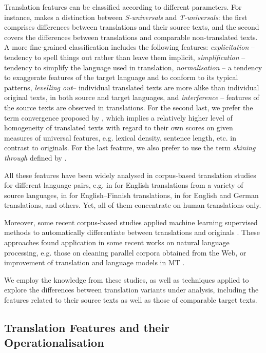 \documentclass[output=paper]{LSP/langsci}
\begin{document}
Translation features can be classified according to different parameters. For instance, \citet{Chesterman2004} makes a distinction between \textit{S-universals} and \textit{T-universals}: the ﬁrst comprises differences between translations and their source texts, and the second covers the differences between translations and comparable non-translated texts. A more ﬁne-grained classification includes the following features: \textit{explicitation} – tendency to spell things out rather than leave them implicit, \textit{simplification} – tendency to simplify the language used in translation, \textit{normalisation} – a tendency to exaggerate features of the target language and to conform to its typical patterns, \textit{levelling out}– individual translated texts are more alike than individual original texts, in both source and target languages, and \textit{interference} – features of the source texts are observed in translations. For the second last, we prefer the term convergence proposed by \citet{Laviosa2002}, which implies a relatively higher level of homogeneity of translated texts with regard to their own scores on given measures of universal features, e.g. lexical density, sentence length, etc. in contrast to originals.  For the last feature, we also prefer to use the term \textit{shining through} defined by \citet{Teich2003}.

All these features have been widely analysed in corpus-based translation studies for different language pairs, e.g. in \citet{Laviosa1996} for English translations from a variety of source languages, in \citet{Mauranen2000} for English--Finnish translations, in \citet{Teich2003} for English and German translations, and others. Yet, all of them concentrate on human translations only.

Moreover, some recent corpus-based studies applied machine learning supervised methods to automatically differentiate between translations and originals \citep[e.g.][]{Baroni2006}. These approaches found application in some recent works on natural language processing, e.g. those on cleaning parallel corpora obtained from the Web, or improvement of translation and language models in MT  \citep[e.g.][]{Kurokawa2009,KoppelOrdan2011,Lembersky2012}.

We employ the knowledge from these studies, as well as techniques applied to explore the differences between translation variants under analysis, including the features related to their source texts as well as those of comparable target texts.

\subsection{Translation Features and their Operationalisation} \label{sec:4:2:2}
\end{document}
